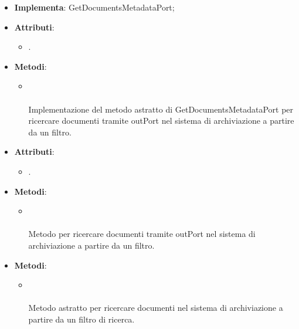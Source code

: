 \documentclass[10pt, a4paper]{article}
\begin{document}
\label{GetDocumentsListAWSS3Dettaglio}
\begin{itemize}
    \item \textbf{Implementa}: GetDocumentsMetadataPort;
    \item \textbf{Attributi}:
    \begin{itemize}
        \item {}.
    \end{itemize}
    \item \textbf{Metodi}:
    \begin{itemize}
        \item {}\\ \\
        Implementazione del metodo astratto di GetDocumentsMetadataPort per ricercare documenti tramite outPort nel sistema di archiviazione a partire da un filtro.
        
    \end{itemize}
\end{itemize}

\label{GetDocumentsMetadataDettaglio}
\begin{itemize}
    \item \textbf{Attributi}:
    \begin{itemize}
        \item {}.
    \end{itemize}
    \item \textbf{Metodi}:
    \begin{itemize}
        \item {}\\ \\
        Metodo per ricercare documenti tramite outPort nel sistema di archiviazione a partire da un filtro.
    \end{itemize}
\end{itemize}

\label{GetDocumentsMetadataPortDettaglio}
\begin{itemize}
    \item \textbf{Metodi}:
    \begin{itemize}
        \item {}\\ \\
        Metodo astratto per ricercare documenti nel sistema di archiviazione a partire da un filtro di ricerca.
    \end{itemize}
\end{itemize}
\end{document}

